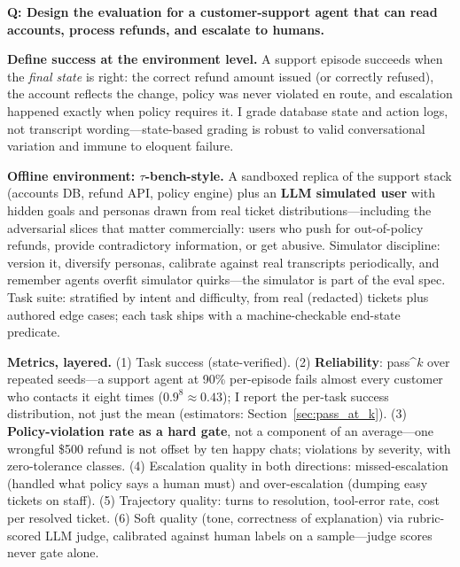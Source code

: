 
\begin{interviewq}
\textbf{Q: Design the evaluation for a customer-support agent that can read accounts, process refunds, and escalate to humans.}

 \quad {} \quad \badgefreq{\freqmed}

\stronganswer

\textbf{Define success at the environment level.} A support episode succeeds when the \textit{final state} is right: the correct refund amount issued (or correctly refused), the account reflects the change, policy was never violated en route, and escalation happened exactly when policy requires it. I grade database state and action logs, not transcript wording---state-based grading is robust to valid conversational variation and immune to eloquent failure.

\textbf{Offline environment: $\tau$-bench-style.} A sandboxed replica of the support stack (accounts DB, refund API, policy engine) plus an \textbf{LLM simulated user} with hidden goals and personas drawn from real ticket distributions---including the adversarial slices that matter commercially: users who push for out-of-policy refunds, provide contradictory information, or get abusive. Simulator discipline: version it, diversify personas, calibrate against real transcripts periodically, and remember agents overfit simulator quirks---the simulator is part of the eval spec. Task suite: stratified by intent and difficulty, from real (redacted) tickets plus authored edge cases; each task ships with a machine-checkable end-state predicate.

\textbf{Metrics, layered.} (1) Task success (state-verified). (2) \textbf{Reliability}: pass\textasciicircum{}$k$ over repeated seeds---a support agent at 90\% per-episode fails almost every customer who contacts it eight times ($0.9^8 \approx 0.43$); I report the per-task success distribution, not just the mean (estimators: Section~\ref{sec:pass_at_k}). (3) \textbf{Policy-violation rate as a hard gate}, not a component of an average---one wrongful \$500 refund is not offset by ten happy chats; violations by severity, with zero-tolerance classes. (4) Escalation quality in both directions: missed-escalation (handled what policy says a human must) and over-escalation (dumping easy tickets on staff). (5) Trajectory quality: turns to resolution, tool-error rate, cost per resolved ticket. (6) Soft quality (tone, correctness of explanation) via rubric-scored LLM judge, calibrated against human labels on a sample---judge scores never gate alone.


\end{interviewq}
